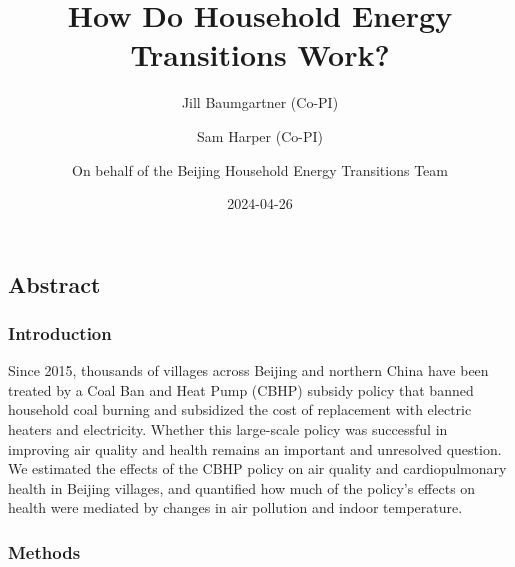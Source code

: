 \documentclass[
  letterpaper,
  DIV=11,
  numbers=noendperiod]{scrartcl}
\title{How Do Household Energy Transitions Work?}
\author{Jill Baumgartner (Co-PI) \and Sam Harper (Co-PI) \and On behalf
of the Beijing Household Energy Transitions Team}
\date{2024-04-26}
\renewcommand*\contentsname{Table of contents}
\newcommand\contentsname{Table of contents}
\begin{document}
\maketitle
\ifdefined\Shaded\renewenvironment{Shaded}{\begin{tcolorbox}[boxrule=0pt, interior hidden, borderline west={3pt}{0pt}{shadecolor}, frame hidden, sharp corners, enhanced, breakable]}{\end{tcolorbox}}\fi

\renewcommand*\contentsname{Table of contents}
{
\hypersetup{linkcolor=}
\setcounter{tocdepth}{3}
\tableofcontents
}
\hypertarget{abstract}{%
\subsection*{Abstract}\label{abstract}}

\hypertarget{introduction}{%
\subsubsection*{Introduction}\label{introduction}}

Since 2015, thousands of villages across Beijing and northern China have
been treated by a Coal Ban and Heat Pump (CBHP) subsidy policy that
banned household coal burning and subsidized the cost of replacement
with electric heaters and electricity. Whether this large-scale policy
was successful in improving air quality and health remains an important
and unresolved question. We estimated the effects of the CBHP policy on
air quality and cardiopulmonary health in Beijing villages, and
quantified how much of the policy's effects on health were mediated by
changes in air pollution and indoor temperature.

\hypertarget{methods}{%
\subsubsection*{Methods}\label{methods}}
\end{document}
